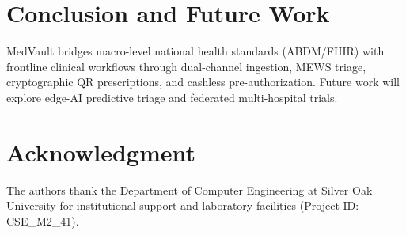 \documentclass[conference]{IEEEtran}
\begin{document}
\section{Conclusion and Future Work}
MedVault bridges macro-level national health standards (ABDM/FHIR) with frontline clinical workflows through dual-channel ingestion, MEWS triage, cryptographic QR prescriptions, and cashless pre-authorization. Future work will explore edge-AI predictive triage and federated multi-hospital trials.

\section*{Acknowledgment}
The authors thank the Department of Computer Engineering at Silver Oak University for institutional support and laboratory facilities (Project ID: CSE\_M2\_41).
\end{document}
